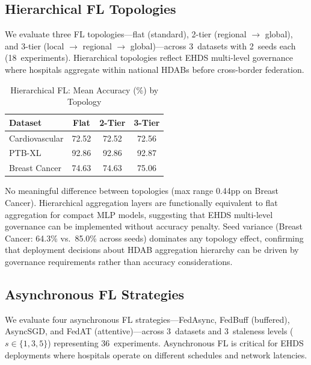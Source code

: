\documentclass[conference]{IEEEtran}
\begin{document}
\subsection{Hierarchical FL Topologies}
\label{sec:hierarchical_fl}

We evaluate three FL topologies---flat (standard), 2-tier (regional $\to$ global), and 3-tier (local $\to$ regional $\to$ global)---across 3~datasets with 2~seeds each (18~experiments). Hierarchical topologies reflect EHDS multi-level governance where hospitals aggregate within national HDABs before cross-border federation.

\begin{table}[htbp]
\centering
\caption{Hierarchical FL: Mean Accuracy (\%) by Topology}
\label{tab:hierarchical_fl}
\begin{tabular}{lccc}
\toprule
Dataset & Flat & 2-Tier & 3-Tier \\
\midrule
Cardiovascular & 72.52 & 72.52 & 72.56 \\
PTB-XL & 92.86 & 92.86 & 92.87 \\
Breast Cancer & 74.63 & 74.63 & 75.06 \\
\bottomrule
\end{tabular}

\vspace{1mm}
\footnotesize{No meaningful difference between topologies (max range 0.44pp on Breast Cancer). Hierarchical aggregation layers are functionally equivalent to flat aggregation for compact MLP models, suggesting that EHDS multi-level governance can be implemented without accuracy penalty. Seed variance (Breast Cancer: 64.3\% vs.\ 85.0\% across seeds) dominates any topology effect, confirming that deployment decisions about HDAB aggregation hierarchy can be driven by governance requirements rather than accuracy considerations.}
\end{table}

\subsection{Asynchronous FL Strategies}
\label{sec:async_fl}

We evaluate four asynchronous FL strategies---FedAsync, FedBuff (buffered), AsyncSGD, and FedAT (attentive)---across 3~datasets and 3~staleness levels ($s \in \{1, 3, 5\}$) representing 36~experiments. Asynchronous FL is critical for EHDS deployments where hospitals operate on different schedules and network latencies.
\end{document}

